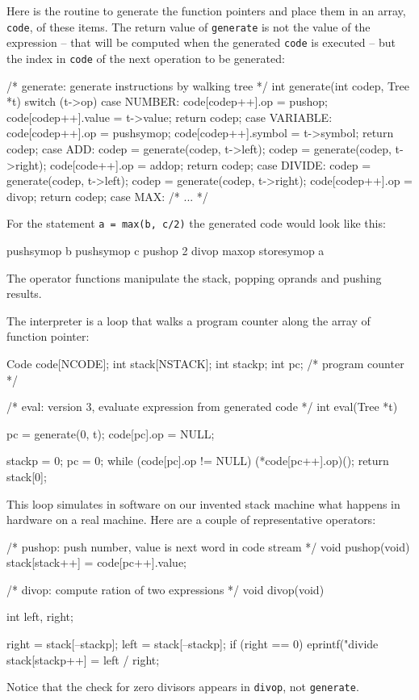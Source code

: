 Here is the routine to generate the function pointers and place them in an
array, \verb'code', of these items. The return value of \verb'generate' is
not the value of the expression -- that will be computed when the generated
\verb'code' is executed -- but the index in \verb'code' of the next
operation to be generated:
\begin{wellcode}
    /* generate: generate instructions by walking tree */
    int generate(int codep, Tree *t)
    {
        switch (t->op) {
        case NUMBER:
            code[codep++].op = pushop;
            code[codep++].value = t->value;
            return codep;
        case VARIABLE:
            code[codep++].op = pushsymop;
            code[codep++].symbol = t->symbol;
            return codep;
        case ADD:
            codep = generate(codep, t->left);
            codep = generate(codep, t->right);
            code[code++].op = addop;
            return codep;
        case DIVIDE:
            codep = generate(codep, t->left);
            codep = generate(codep, t->right);
            code[codep++].op = divop;
            return codep;
        case MAX:
            /* ... */
        }
    }
\end{wellcode}
For the statement \verb'a = max(b, c/2)' the generated code would look like
this:
\begin{wellcode}
    pushsymop
    b
    pushsymop
    c
    pushop
    2
    divop
    maxop
    storesymop
    a
\end{wellcode}
The operator functions manipulate the stack, popping oprands and pushing
results.

The interpreter is a loop that walks a program counter along the array of
function pointer:
\begin{wellcode}
    Code code[NCODE];
    int stack[NSTACK];
    int stackp;
    int pc; /* program counter */

    /* eval: version 3, evaluate expression from generated code */
    int eval(Tree *t)
    {
        pc = generate(0, t);
        code[pc].op = NULL;

        stackp = 0;
        pc = 0;
        while (code[pc].op != NULL)
            (*code[pc++].op)();
        return stack[0];
    }
\end{wellcode}
This loop simulates in software on our invented stack machine what happens
in hardware on a real machine. Here are a couple of representative
operators:
\begin{wellcode}
    /* pushop: push number, value is next word in code stream */
    void pushop(void)
    {
        stack[stack++] = code[pc++].value;
    }

    /* divop: compute ration of two expressions */
    void divop(void)
    {
        int left, right;

        right = stack[--stackp];
        left = stack[--stackp];
        if (right == 0)
            eprintf("divide %
        stack[stackp++] = left / right;
    }
\end{wellcode}
Notice that the check for zero divisors appears in \verb'divop', not
\verb'generate'.

